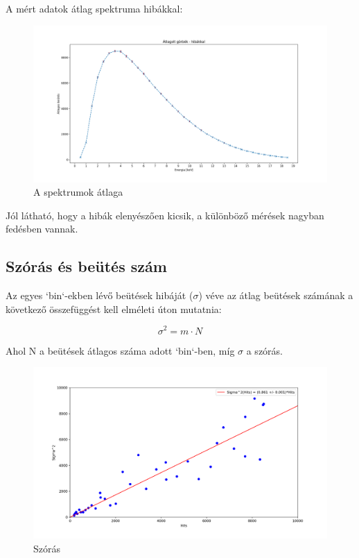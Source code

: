\documentclass[12pt,a4paper]{article}
\theoremstyle{plain}
\begin{document}
\hspace*{10pt} A mért adatok átlag spektruma hibákkal:

\vspace{0.2cm}

\begin{figure}[!h]
	\centering
	\includegraphics[width=0.9\linewidth ]{./atlagolt-gorbek-hibakkal.png}
	\caption{A spektrumok átlaga}
\end{figure}

\vspace{0.2cm}

\par Jól látható, hogy a hibák elenyészően kicsik, a különböző mérések
nagyban fedésben vannak.

\vspace{0.2cm}

\subsection{Szórás és beütés szám}

\par Az egyes `bin`-ekben lévő beütések hibáját ($\sigma$) véve
az átlag beütések számának a következő összefüggést kell elméleti
úton mutatnia:

\vspace{0.2cm}

\begin{equation*}
	\sigma^{2} = m\cdot N
\end{equation*}

\vspace{0.2cm}

\par Ahol N a beütések átlagos száma adott `bin`-ben, míg $\sigma$
a szórás.

\vspace{0.2cm}

\begin{figure}[H]
	\centering
	\includegraphics[width=0.75\linewidth ]{./szoras.png}
	\caption{Szórás}
\end{figure}
\end{document}

